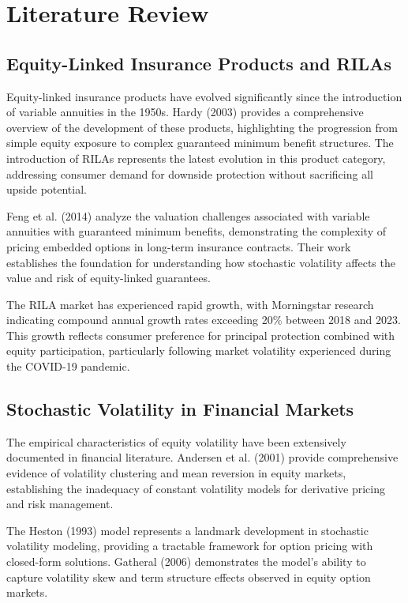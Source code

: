 \documentclass[12pt,a4paper]{report}
\begin{document}
\chapter{Literature Review}

\section{Equity-Linked Insurance Products and RILAs}

Equity-linked insurance products have evolved significantly since the introduction of variable annuities in the 1950s. Hardy (2003) provides a comprehensive overview of the development of these products, highlighting the progression from simple equity exposure to complex guaranteed minimum benefit structures. The introduction of RILAs represents the latest evolution in this product category, addressing consumer demand for downside protection without sacrificing all upside potential.

Feng et al. (2014) analyze the valuation challenges associated with variable annuities with guaranteed minimum benefits, demonstrating the complexity of pricing embedded options in long-term insurance contracts. Their work establishes the foundation for understanding how stochastic volatility affects the value and risk of equity-linked guarantees.

The RILA market has experienced rapid growth, with Morningstar research indicating compound annual growth rates exceeding 20\% between 2018 and 2023. This growth reflects consumer preference for principal protection combined with equity participation, particularly following market volatility experienced during the COVID-19 pandemic.

\section{Stochastic Volatility in Financial Markets}

The empirical characteristics of equity volatility have been extensively documented in financial literature. Andersen et al. (2001) provide comprehensive evidence of volatility clustering and mean reversion in equity markets, establishing the inadequacy of constant volatility models for derivative pricing and risk management.

The Heston (1993) model represents a landmark development in stochastic volatility modeling, providing a tractable framework for option pricing with closed-form solutions. Gatheral (2006) demonstrates the model's ability to capture volatility skew and term structure effects observed in equity option markets.
\end{document}
